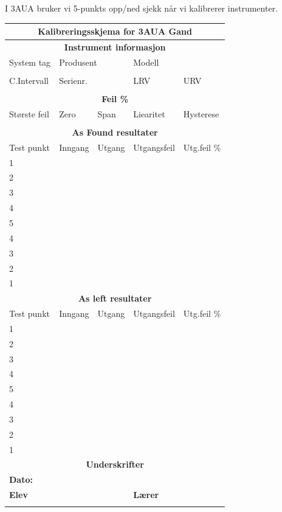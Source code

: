 I 3AUA bruker vi 5-punkts opp/ned sjekk når vi kalibrerer instrumenter. 

\vfil \eject
\large
\begin{center}
\begin{tabular}{ | m{2cm} | m{2cm} |m{2cm} |m{2cm} |m{2cm} |} 
\hline
	\multicolumn{5}{|c|}{\textbf{\cellcolor[HTML]{D5D5D5}Kalibreringsskjema for 3AUA Gand}} \\
\hline
\hline
\hline
	\multicolumn{5}{|c|}{\textbf{\cellcolor[HTML]{D5D5D5}Instrument informasjon}}\\
\hline
	System tag&	\multicolumn{2}{l|}{Produsent}&\multicolumn{2}{l|}{Modell}\\
\hline
&	\multicolumn{2}{l|}{}&\multicolumn{2}{l|}{}\\
\hline
	C.Intervall&\multicolumn{2}{l|}{Serienr.}&LRV&URV\\
\hline
	&	\multicolumn{2}{l|}{}&&\\
\hline
	\multicolumn{5}{|c|}{\textbf{\cellcolor[HTML]{D5D5D5}Feil \%} }\\
\hline
	Største feil&Zero&Span&Liearitet&Hysterese\\
\hline
	&&&&\\
\hline
	\multicolumn{5}{|c|}{\cellcolor[HTML]{D5D5D5}\textbf{As Found resultater}}\\
\hline
	Test punkt	&Inngang&Utgang&Utgangsfeil&Utg.feil \%\\
\hline
1&&&&\\
\hline
2&&&&\\
\hline
3&&&&\\
\hline
4&&&&\\
\hline
5&&&&\\
\hline
4&&&&\\
\hline
3&&&&\\
\hline
2&&&&\\
\hline
1&&&&\\
\hline
	\multicolumn{5}{|c|}{\cellcolor[HTML]{D5D5D5}\textbf{As left resultater}}\\
\hline
	Test punkt	&Inngang&Utgang&Utgangsfeil&Utg.feil \%\\
\hline
1&&&&\\
\hline
2&&&&\\
\hline
3&&&&\\
\hline
4&&&&\\
\hline
5&&&&\\
\hline
4&&&&\\
\hline
3&&&&\\
\hline
2&&&&\\
\hline
1&&&&\\
\hline
	\multicolumn{5}{|c|}{\textbf{\cellcolor[HTML]{D5D5D5}Underskrifter}}\\
\hline
	\multicolumn{5}{|l|}{\textbf{Dato:}}\\
\hline
	\multicolumn{3}{|l|}{\textbf{Elev}}&\multicolumn{2}{l|}{\textbf{Lærer}}\\
\hline
	\multicolumn{3}{|c|}{}&\multicolumn{2}{c|}{}\\
\hline
\end{tabular}
\end{center}
\normalsize
\vfil \eject

